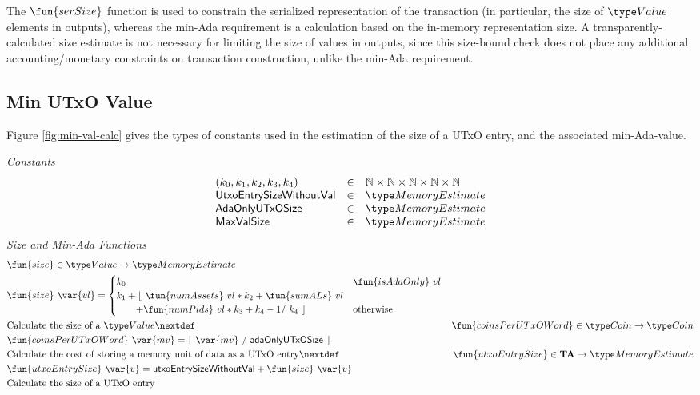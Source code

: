     The $\fun{serSize}$ function is used to constrain
    the serialized representation of the transaction (in particular, the size
    of $\Value$ elements in outputs), whereas the min-Ada requirement is a calculation based on
    the in-memory representation size. A transparently-calculated size estimate
    is not necessary for limiting the size of values in outputs, since this size-bound
    check does not place any additional accounting/monetary constraints on transaction construction,
    unlike the min-Ada requirement.

\subsection{Min UTxO Value}
\label{sec:min-value}

Figure \ref{fig:min-val-calc} gives the types of constants used in the estimation
of the size of a UTxO entry, and the associated min-Ada-value.

\begin{figure*}[h]
  \emph{Constants}
  \begin{equation*}
    \begin{array}{lcl}
      (k_0, k_1, k_2, k_3, k_4) & \in & \N \times \N \times \N \times \N \times \N \\
      \mathsf{UtxoEntrySizeWithoutVal} & \in & \MemoryEstimate \\
      \mathsf{AdaOnlyUTxOSize} & \in & \MemoryEstimate \\
      \mathsf{MaxValSize} & \in & \MemoryEstimate \\
    \end{array}
  \end{equation*}
  \emph{Size and Min-Ada Functions}
  \begin{align*}
    & \fun{size} \in \Value \to \MemoryEstimate \\
    & \fun{size}~\var{vl} =
    \begin{cases}
      k_0 & \fun{isAdaOnly}~vl\\
      k_1 + \lfloor~ \fun{numAssets}~vl * k_2 + \fun{sumALs}~vl & \\
      ~~~~~~ + \fun{numPids}~vl * k_3 + k_4 - 1 /~ k_4~\rfloor & \text{otherwise} \\
    \end{cases} \\
    & \text{Calculate the size of a $\Value$}
    \nextdef
    & \fun{coinsPerUTxOWord}\in \Coin \to \Coin \\
    & \fun{coinsPerUTxOWord}~\var{mv} = \lfloor~ \var{mv}~/~ \mathsf{adaOnlyUTxOSize}~ \rfloor \\
    & \text{Calculate the cost of storing a memory unit of data as a UTxO entry}
    \nextdef
    & \fun{utxoEntrySize} \in \ValMonoid \to \MemoryEstimate \\
    & \fun{utxoEntrySize}~\var{v} = \mathsf{utxoEntrySizeWithoutVal} + \fun{size}~\var{v} \\
    & \text{Calculate the size of a UTxO entry}
\end{align*}
\caption{Value Size Calculation}
\label{fig:min-val-calc}
\end{figure*}

